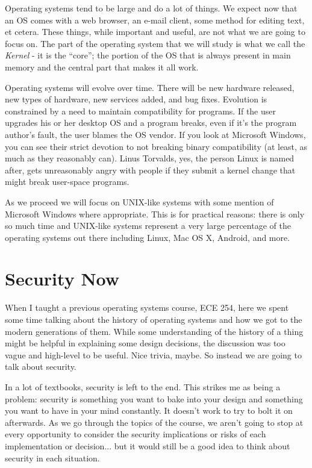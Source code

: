 Operating systems tend to be large and do a lot of things. We expect now that an OS comes with a web browser, an e-mail client, some method for editing text, et cetera. These things, while important and useful, are not what we are going to focus on. The part of the operating system that we will study is what we call the \textit{Kernel} - it is the ``core''; the portion of the OS that is always present in main memory and the central part that makes it all work.

Operating systems will evolve over time. There will be new hardware released, new types of hardware, new services added, and bug fixes. Evolution is constrained by a need to maintain compatibility for programs. If the user upgrades his or her desktop OS and a program breaks, even if it's the program author's fault, the user blames the OS vendor. If you look at Microsoft Windows, you can see their strict devotion to not breaking binary compatibility (at least, as much as they reasonably can). Linus Torvalds, yes, the person Linux is named after, gets unreasonably angry with people if they submit a kernel change that might break user-space programs. 

As we proceed we will focus on UNIX-like systems with some mention of Microsoft Windows where appropriate. This is for practical reasons: there is only so much time and UNIX-like systems represent a very large percentage of the operating systems out there including Linux, Mac OS X, Android, and more.

\section*{Security Now}
When I taught a previous operating systems course, ECE 254, here we spent some time talking about the history of operating systems and how we got to the modern generations of them. While some understanding of the history of a thing might be helpful in explaining some design decisions, the discussion was too vague and high-level to be useful. Nice trivia, maybe. So instead we are going to talk about security.

In a lot of textbooks, security is left to the end. This strikes me as being a problem: security is something you want to bake into your design and something you want to have in your mind constantly. It doesn't work to try to bolt it on afterwards. As we go through the topics of the course, we aren't going to stop at every opportunity to consider the security implications or risks of each implementation or decision... but it would still be a good idea to think about security in each situation.

